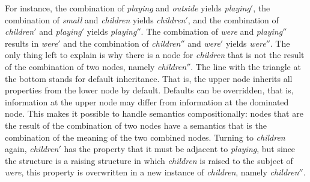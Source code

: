 For instance, the combination of \emph{playing} and \emph{outside} yields \emph{playing}$'$, the
combination of \emph{small} and \emph{children} yields \emph{children}$'$, and the combination of
\emph{children}$'$ and \emph{playing}$'$ yields \emph{playing}$''$. The combination of \emph{were}
and \emph{playing}$''$ results in \emph{were}$'$ and the combination of \emph{children}$''$ and
\emph{were}$'$ yields \emph{were}$''$. The only thing left to explain is why there is a node for
\emph{children} that is not the result of the combination of two nodes, namely
\emph{children}$''$. The line with the triangle at the bottom stands for default inheritance. That
is, the upper node inherits all properties from the lower node by default. Defaults can be
overridden, that is, information at the upper node may differ from information at the dominated
node. This makes it possible to handle semantics compositionally: nodes that are the result of the
combination of two nodes have a semantics that is the combination of the meaning of the two combined
nodes. Turning to \emph{children} again, \emph{children}$'$ has the property that it must be adjacent to \emph{playing}, but since the
structure is a raising structure in which \emph{children} is raised to the subject of \emph{were},
this property is overwritten in a new instance of \emph{children}, namely \emph{children}$''$.

